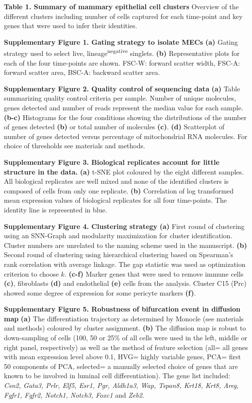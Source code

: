 \documentclass[titlepage, 12pt, oneside]{amsart}
\newcommand{\faketable}[1]%
{\refstepcounter{table}\label{#1}}
\begin{document}
\textbf{Table 1. Summary of mammary epithelial cell clusters}
\faketable{T1}
Overview of the different clusters including number of cells captured for each time-point and key genes that were used to infer their identities.

\textbf{Supplementary Figure 1. Gating strategy to isolate MECs}
\textbf{(a)} Gating strategy used to select live, lineage\textsuperscript{negative} singlets.
\textbf{(b)} Representative plots for each of the four time-points are shown. FSC-W: forward scatter width, FSC-A: forward scatter area, BSC-A: backward scatter area.

\textbf{Supplementary Figure 2. Quality control of sequencing data}
\textbf{(a)} Table summarizing quality control criteria per sample.
Number of unique molecules, genes detected and number of reads represent the median value for each sample.
\textbf{(b-c)} Histograms for the four conditions showing the distributions of the number of genes detected \textbf{(b)} or total number of molecules \textbf{(c)}.
\textbf{(d)} Scatterplot of number of genes detected versus percentage of mitochondrial RNA molecules.
For choice of thresholds see materials and methods.

\textbf{Supplementary Figure 3. Biological replicates account for little structure in the data.}
\textbf{(a)} t-SNE plot coloured by the eight different samples. All biological replicates are well mixed and none of the identified clusters is composed of cells from only one replicate.
\textbf{(b)} Correlation of log transformed mean expression values of biological replicates for all four time-points. The identity line is represented in blue.

\textbf{Supplementary Figure 4. Clustering strategy}
\textbf{(a)} First round of clustering using an SNN-Graph and modularity maximization for cluster identification. Cluster numbers are unrelated to the naming scheme used in the manuscript.
\textbf{(b)} Second round of clustering using hierarchical clustering based on Spearman's rank correlation with average linkage.
The gap statistic was used as optimization criterion to choose $k$.
\textbf{(c-f)} Marker genes that were used to remove immune cells \textbf{(c)}, fibroblasts \textbf{(d)} and endothelial \textbf{(e)} cells from the analysis. Cluster C15 (Prc) showed some degree of expression for some pericyte markers \textbf{(f)}.

\textbf{Supplementary Figure 5. Robustness of bifurcation event in diffusion map}
\textbf{(a)} The differentiation trajectory as determined by Monocle (see materials and methods) coloured by cluster assignment.
\textbf{(b)} The diffusion map is robust to down-sampling of cells (100, 50 or 25\% of all cells were used in the left, middle or right panel, respectively) as well as the method of feature selection (all= all genes with mean expression level above 0.1, HVG= highly variable genes, PCA= first 50 components of PCA, selected= a manually selected choice of genes that are known to be involved in luminal cell differentiation).
The gene list included: \textit{Csn2, Gata3, Prlr, Elf5, Esr1, Pgr, Aldh1a3, Wap, Tspan8, Krt18, Krt8, Areg, Fgfr1, Fgfr2, Notch1, Notch3, Foxc1} and \textit{Zeb2}.
\end{document}
